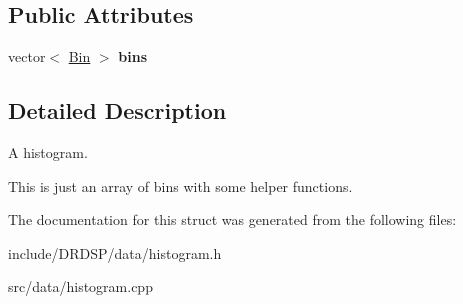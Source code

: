 \subsection*{Public Attributes}
\begin{DoxyCompactItemize}
\item 
\hypertarget{struct_d_r_d_s_p_1_1_histogram_af08514f760ecf60c8ccd422e38bd98cc}{vector$<$ \hyperlink{struct_d_r_d_s_p_1_1_bin}{Bin} $>$ {\bfseries bins}}\label{struct_d_r_d_s_p_1_1_histogram_af08514f760ecf60c8ccd422e38bd98cc}

\end{DoxyCompactItemize}


\subsection{Detailed Description}
A histogram. 

This is just an array of bins with some helper functions. 

The documentation for this struct was generated from the following files\-:\begin{DoxyCompactItemize}
\item 
include/\-D\-R\-D\-S\-P/data/histogram.\-h\item 
src/data/histogram.\-cpp\end{DoxyCompactItemize}
